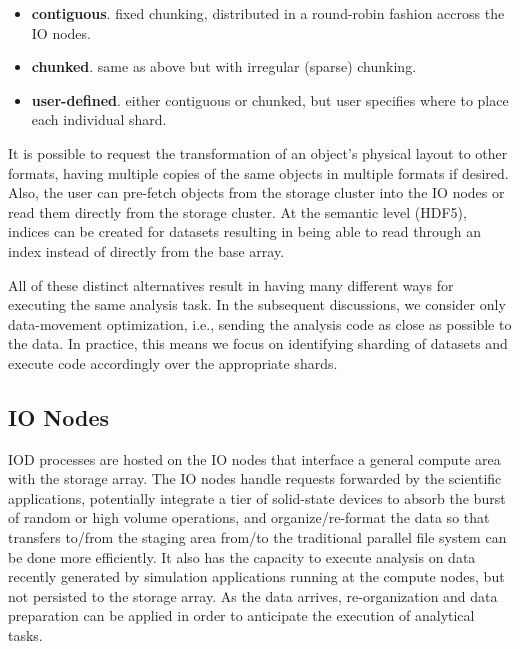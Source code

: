 \documentclass[conference]{IEEEtran}
\begin{document}
\begin{itemize}
\itemsep1pt\parskip0pt
\item
  \textbf{contiguous}. fixed chunking, distributed in a round-robin
  fashion accross the IO nodes.
\item
  \textbf{chunked}. same as above but with irregular (sparse) chunking.
\item
  \textbf{user-defined}. either contiguous or chunked, but user specifies
  where to place each individual shard.
\end{itemize}

It is possible to request the transformation of an object's physical
layout to other formats, having multiple copies of the same objects in
multiple formats if desired. Also, the user can pre-fetch objects from
the storage cluster into the IO nodes or read them directly from the
storage cluster. At the semantic level (HDF5), indices can be created
for datasets resulting in being able to read through an index instead of
directly from the base array.

All of these distinct alternatives result in having many different ways for
executing the same analysis task.
In the subsequent discussions, we consider only
data-movement optimization, i.e., sending the analysis code as close as
possible to the data. In practice, this means we focus on identifying
sharding of datasets and execute code accordingly over the appropriate
shards.


\subsection{IO Nodes}
IOD processes are hosted on the IO nodes that interface a general compute area
with the storage array. The IO nodes handle requests forwarded by the
scientific applications, potentially integrate a tier of solid-state devices to
absorb the burst of random or high volume operations, and organize/re-format
the data so that transfers to/from the staging area from/to the traditional
parallel file system can be done more efficiently. It also has the capacity to
execute analysis on data recently generated by simulation applications running
at the compute nodes, but not persisted to the storage array. As the data
arrives, re-organization and data preparation can be applied in order to
anticipate the execution of analytical tasks.
\end{document}
